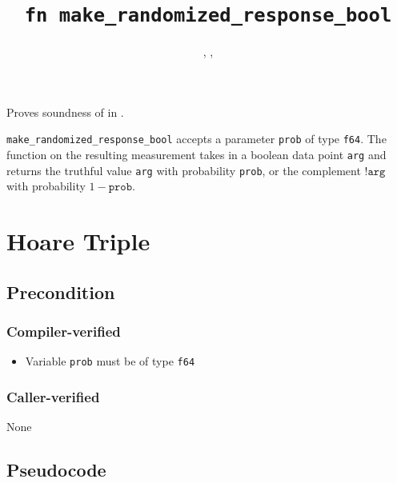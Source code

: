 \documentclass{article}
\title{\texttt{fn make\_randomized\_response\_bool}}
\author{\VickiXuAuthor, \HanwenZhangAuthor, \ZacharyRatliffAuthor}
\begin{document}
\maketitle

\contrib

Proves soundness of  in .

\texttt{make\_randomized\_response\_bool} accepts a parameter \texttt{prob} of type \texttt{f64}.
The function on the resulting measurement takes in a boolean data point \texttt{arg} and returns the truthful value \texttt{arg} with probability \texttt{prob},
or the complement $\texttt{!arg}$ with probability $1 - \texttt{prob}$.



\section{Hoare Triple}

\subsection*{Precondition}
\subsubsection*{Compiler-verified}
\begin{itemize}
    \item Variable \texttt{prob} must be of type \texttt{f64}
\end{itemize}

\subsubsection*{Caller-verified}
None

\subsection*{Pseudocode}

\end{document}
